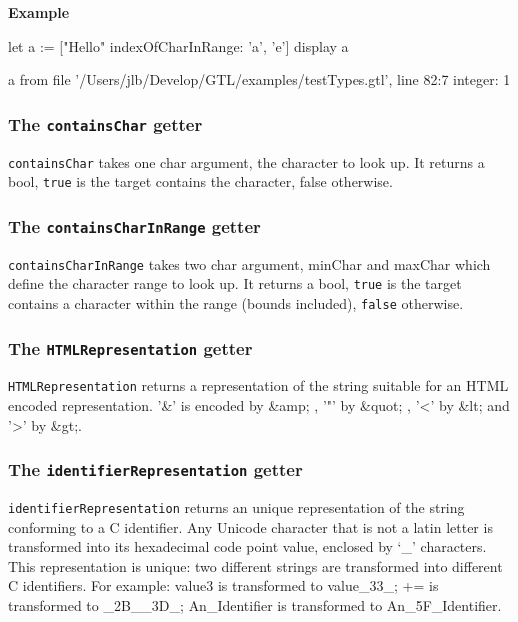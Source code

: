 \documentclass[10pt,openright,twosides,final]{memoir}
\newcommand{\character}[1]{{\small\ttfamily `{#1}'}}
\newcommand{\cdata}[1]{{\ttfamily #1}}
\newcommand{\ccst}[1]{{\footnotesize\ttfamily\colorbox{light-blue}{'#1'}}}
\newcommand{\gtlarg}[1]{{\footnotesize\ttfamily\colorbox{light-blue}{#1}}}
\newcommand{\gtlinline}[1]{\colorbox{light-blue}{\lstinline[language=gtl]{#1}}}
\newcommand{\example}{\vspace{.75em}\noindent\textbf{Example}\vspace{0em}}
\begin{document}
\example
\begin{gtl}
let a := ["Hello" indexOfCharInRange: 'a', 'e']
display a
\end{gtl}
\begin{console}
a from file '/Users/jlb/Develop/GTL/examples/testTypes.gtl', line 82:7
    integer: 1
\end{console}

\subsubsection{The \texttt{containsChar} getter}

\gtlinline{containsChar} takes one char argument, the \gtlarg{character} to look up. It returns a bool, \gtlinline{true} is the target contains the \gtlarg{character}, \gtlarg{false} otherwise.

\subsubsection{The \texttt{containsCharInRange} getter}

\gtlinline{containsCharInRange} takes two char argument, \gtlarg{minChar} and \gtlarg{maxChar} which define the character range to look up. It returns a bool, \texttt{true} is the target contains a character within the range (bounds included), \texttt{false} otherwise.

\subsubsection{The \texttt{HTMLRepresentation} getter}

\gtlinline{HTMLRepresentation} returns a representation of the string suitable for an HTML encoded representation. \ccst{\&} is encoded by \cdata{\&amp;} , \ccst{"} by \cdata{\&quot;} , \ccst{<} by \cdata{\&lt;} and \ccst{>} by \cdata{\&gt;}.


\subsubsection{The \texttt{identifierRepresentation} getter}

\gtlinline{identifierRepresentation} returns an unique representation of the string conforming to a C identifier. Any Unicode character that is not a latin letter is transformed into its hexadecimal code point value, enclosed by \character{_} characters. This representation is unique: two different strings are transformed into different C identifiers. For example: \cdata{value3} is transformed to \cdata{value_33_}; \cdata{+=} is transformed to \cdata{_2B__3D_};
\cdata{An_Identifier} is transformed to \cdata{An_5F_Identifier}.
\end{document}
